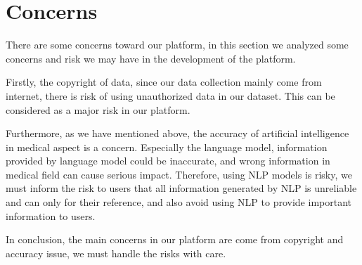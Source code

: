 \section{Concerns}
There are some concerns toward our platform, in this section we analyzed some concerns and risk we may have in the development of the platform.

Firstly, the copyright of data, since our data collection mainly come from internet, there is risk of using unauthorized data in our dataset. This can be considered as a major risk in our platform.

Furthermore, as we have mentioned above, the accuracy of artificial intelligence in medical aspect is a concern. Especially the language model, information provided by language model could be inaccurate, and wrong information in medical field can cause serious impact. Therefore, using NLP models is risky, we must inform the risk to users that all information generated by NLP is unreliable and can only for their reference, and also avoid using NLP to provide important information to users.

In conclusion, the main concerns in our platform are come from copyright and accuracy issue, we must handle the risks with care.